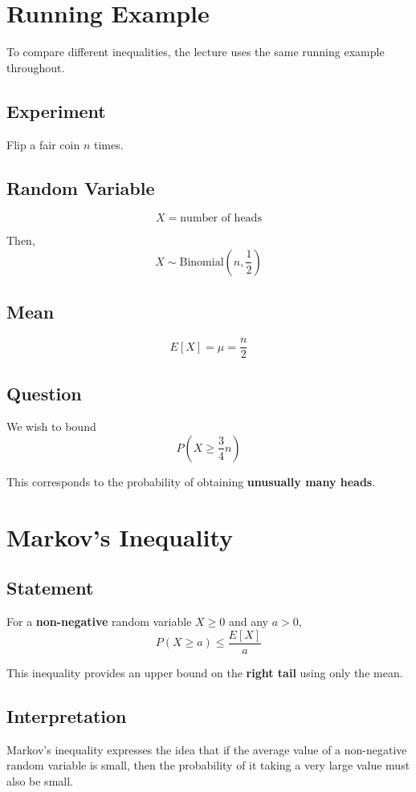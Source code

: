\documentclass[12pt]{article}
\begin{document}
\section{Running Example}

To compare different inequalities, the lecture uses the same running example throughout.

\subsection{Experiment}
Flip a fair coin \(n\) times.

\subsection{Random Variable}
\[
X = \text{number of heads}
\]

Then,
\[
X \sim \text{Binomial}\left(n,\frac12\right)
\]

\subsection{Mean}
\[
E[X]=\mu=\frac{n}{2}
\]

\subsection{Question}
We wish to bound
\[
P\left(X \ge \frac34 n\right)
\]

This corresponds to the probability of obtaining \textbf{unusually many heads}.

\section{Markov's Inequality}

\subsection{Statement}
For a \textbf{non-negative} random variable \(X \ge 0\) and any \(a>0\),
\[
P(X \ge a)\le \frac{E[X]}{a}
\]

This inequality provides an upper bound on the \textbf{right tail} using only the mean.

\subsection{Interpretation}
Markov’s inequality expresses the idea that if the average value of a non-negative random variable is small, then the probability of it taking a very large value must also be small.
\end{document}
